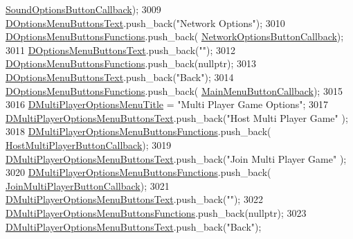 \begin{DoxyCode}
      \hyperlink{classCApplicationData_a7169395ea835eaa9c98188d1b3583534}{SoundOptionsButtonCallback});
3009     \hyperlink{classCApplicationData_aa9201da5408887973cb56fb1671ad6f8}{DOptionsMenuButtonsText}.push\_back(\textcolor{stringliteral}{"Network Options"});
3010     \hyperlink{classCApplicationData_a4c9516d20be17a9c9d5c1119736037e5}{DOptionsMenuButtonsFunctions}.push\_back(
      \hyperlink{classCApplicationData_ad41dbc2f54ee638aa64a1d0c22b3fba9}{NetworkOptionsButtonCallback});
3011     \hyperlink{classCApplicationData_aa9201da5408887973cb56fb1671ad6f8}{DOptionsMenuButtonsText}.push\_back(\textcolor{stringliteral}{""});
3012     \hyperlink{classCApplicationData_a4c9516d20be17a9c9d5c1119736037e5}{DOptionsMenuButtonsFunctions}.push\_back(\textcolor{keyword}{nullptr});
3013     \hyperlink{classCApplicationData_aa9201da5408887973cb56fb1671ad6f8}{DOptionsMenuButtonsText}.push\_back(\textcolor{stringliteral}{"Back"});
3014     \hyperlink{classCApplicationData_a4c9516d20be17a9c9d5c1119736037e5}{DOptionsMenuButtonsFunctions}.push\_back(
      \hyperlink{classCApplicationData_a4410839118b5b74dab798ad7be6f703b}{MainMenuButtonCallback});
3015     
3016     \hyperlink{classCApplicationData_aa9c4883274c2313743a42b68c7fc427f}{DMultiPlayerOptionsMenuTitle} = \textcolor{stringliteral}{"Multi Player Game Options"};
3017     \hyperlink{classCApplicationData_a400aa1df18482fe5d9f34e861a0dc257}{DMultiPlayerOptionsMenuButtonsText}.push\_back(\textcolor{stringliteral}{"Host Multi Player Game"}
      );
3018     \hyperlink{classCApplicationData_ad32d3cc90fd1ead1574cb6c336257e1c}{DMultiPlayerOptionsMenuButtonsFunctions}.push\_back(
      \hyperlink{classCApplicationData_a9f804f7f34e1f0abf8c395cd0032d811}{HostMultiPlayerButtonCallback});
3019     \hyperlink{classCApplicationData_a400aa1df18482fe5d9f34e861a0dc257}{DMultiPlayerOptionsMenuButtonsText}.push\_back(\textcolor{stringliteral}{"Join Multi Player Game"}
      );
3020     \hyperlink{classCApplicationData_ad32d3cc90fd1ead1574cb6c336257e1c}{DMultiPlayerOptionsMenuButtonsFunctions}.push\_back(
      \hyperlink{classCApplicationData_a4fa8cf7a67c0ae980d38e1fe7b967f41}{JoinMultiPlayerButtonCallback});
3021     \hyperlink{classCApplicationData_a400aa1df18482fe5d9f34e861a0dc257}{DMultiPlayerOptionsMenuButtonsText}.push\_back(\textcolor{stringliteral}{""});
3022     \hyperlink{classCApplicationData_ad32d3cc90fd1ead1574cb6c336257e1c}{DMultiPlayerOptionsMenuButtonsFunctions}.push\_back(\textcolor{keyword}{nullptr});
3023     \hyperlink{classCApplicationData_a400aa1df18482fe5d9f34e861a0dc257}{DMultiPlayerOptionsMenuButtonsText}.push\_back(\textcolor{stringliteral}{"Back"});

\end{DoxyCode}
